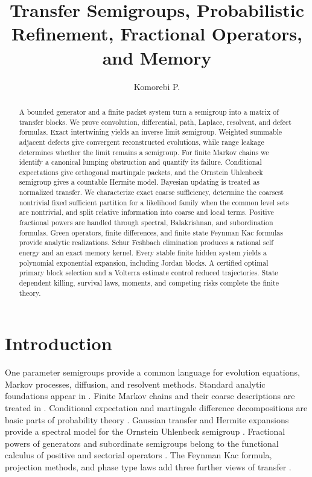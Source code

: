 \documentclass{aomart}
\title[Transfer semigroups and memory]{Transfer Semigroups, Probabilistic Refinement, Fractional Operators, and Memory}
\author[Komorebi P.]{Komorebi P.}
\theoremstyle{definition}
\theoremstyle{remark}
\begin{document}
\begin{abstract}
A bounded generator and a finite packet system turn a semigroup into a matrix of transfer blocks. We prove convolution, differential, path, Laplace, resolvent, and defect formulas. Exact intertwining yields an inverse limit semigroup. Weighted summable adjacent defects give convergent reconstructed evolutions, while range leakage determines whether the limit remains a semigroup. For finite Markov chains we identify a canonical lumping obstruction and quantify its failure. Conditional expectations give orthogonal martingale packets, and the Ornstein Uhlenbeck semigroup gives a countable Hermite model. Bayesian updating is treated as normalized transfer. We characterize exact coarse sufficiency, determine the coarsest nontrivial fixed sufficient partition for a likelihood family when the common level sets are nontrivial, and split relative information into coarse and local terms. Positive fractional powers are handled through spectral, Balakrishnan, and subordination formulas. Green operators, finite differences, and finite state Feynman Kac formulas provide analytic realizations. Schur Feshbach elimination produces a rational self energy and an exact memory kernel. Every stable finite hidden system yields a polynomial exponential expansion, including Jordan blocks. A certified optimal primary block selection and a Volterra estimate control reduced trajectories. State dependent killing, survival laws, moments, and competing risks complete the finite theory.
\end{abstract}
\maketitle
\thispagestyle{plain}

\section{Introduction}\label{sec:introduction}

One parameter semigroups provide a common language for evolution equations, Markov processes, diffusion, and resolvent methods. Standard analytic foundations appear in \cite{Pazy1983,EngelNagel2000}. Finite Markov chains and their coarse descriptions are treated in \cite{KemenySnell1960,Norris1997,RogersPitman1981}. Conditional expectation and martingale difference decompositions are basic parts of probability theory \cite{Williams1991}. Gaussian transfer and Hermite expansions provide a spectral model for the Ornstein Uhlenbeck semigroup \cite{Janson1997}. Fractional powers of generators and subordinate semigroups belong to the functional calculus of positive and sectorial operators \cite{Balakrishnan1960,SchillingSongVondracek2012}. The Feynman Kac formula, projection methods, and phase type laws add three further views of transfer \cite{Kac1949,Feshbach1958,Zwanzig1961,Neuts1981}.
\end{document}
